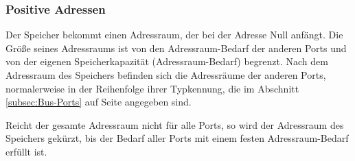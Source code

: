 \subsubsection{Positive Adressen}

Der Speicher bekommt einen Adressraum, der bei der Adresse Null anfängt. Die
Größe seines Adressraums ist von den Adressraum-Bedarf der anderen Ports und
von der eigenen Speicherkapazität (Adressraum-Bedarf) begrenzt. 
Nach dem Adressraum des Speichers befinden sich die Adressräume der anderen
Ports, normalerweise in der Reihenfolge ihrer Typkennung, die im Abschnitt 
\ref{subsec:Bus-Ports} auf Seite \pageref{subsec:Bus-Ports} angegeben sind.

Reicht der gesamte Adressraum  nicht für alle Ports, so wird der Adressraum
des Speichers gekürzt, bis der Bedarf aller Ports mit einem festen
Adressraum-Bedarf erfüllt ist.


